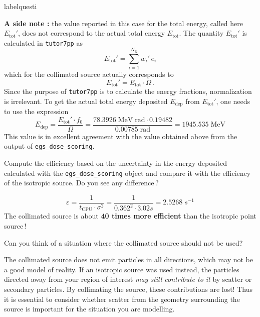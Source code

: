 \documentclass[12pt,twoside]{article}
\makeatletter
\renewcommand\thequesti         {\@arabic\c@questi}
\newenvironment{question}{
    \bfseries
    \edef\@questictr{questi}
    \expandafter
    \list \csname label\@questictr\endcsname {
        \usecounter\@questictr\def\makelabel##1{\hss\llap{##1}}
        \savebox{\questbox}             {\thequesti}
        \setlength\labelsep             {0.6em}
        \setlength\labelwidth           {\wd\questbox}
        \setlength\leftmargini          {\labelwidth}
        \addtolength{\leftmargini}      {\labelsep}
        \addtolength{\leftmargini}      {0.2em}
        \leftmargin\leftmargini
        \setlength\topsep               {1em}
        \setlength\itemsep              {1.2em}
        \setlength\parsep               {0.5em}
    }
}{\normalfont\endlist}
\newenvironment{answer}{\normalfont}{\relax}
\makeatother
\begin{document}
\begin{question}
\begin{answer}
\textbf{A side note :} the value reported in this case for the total
energy, called here $E_\mathrm{tot}'$, does not correspond to the actual total
energy $E_\mathrm{tot}$. The quantity $E_\mathrm{tot}'$ is calculated in
\Verb+tutor7pp+ as
\begin{equation*}
E_\mathrm{tot}' = \sum\limits_{i=1}^{N_{\Omega}}{w_i'\, e_i}
\end{equation*}
which for the collimated source actually corresponds to
\begin{equation*}
E_\mathrm{tot}' = E_\mathrm{tot}\cdot \Omega \,.
\end{equation*}
Since the purpose of \Verb+tutor7pp+ is to calculate the energy fractions,
normalization is irrelevant. To get the actual total energy
deposited $E_\mathrm{dep}$ from $E_\mathrm{tot}'$, one needs to use the
expression
\begin{equation*}
 E_\mathrm{dep} = \frac{E_\mathrm{tot}' \cdot f_0}{\Omega}
 = \frac{78.3926\;\mathrm{MeV\;rad} \cdot 0.19482}{0.00785\;\mathrm{rad}} =
1945.535\; \mathrm{MeV}
\end{equation*}
This value is in excellent agreement with the value obtained above from the output of
\Verb+egs_dose_scoring+.
\end{answer}

\item Compute the efficiency based on the uncertainty in the energy deposited
calculated with the \Verb+egs_dose_scoring+ object and compare it with the
efficiency of the isotropic source. Do you see any difference\,?

\begin{answer}
\begin{equation*}
\varepsilon = \frac{1}{t_\mathrm{CPU}\cdot \sigma^2} = \frac{1}{0.362^2 \cdot
3.02 s} = 2.5268\; s^{-1}
\end{equation*}
The collimated source is about \textbf{40 times more efficient} than the
isotropic point source\,!
\end{answer}

\item Can you think of a situation where the collimated source should not be used?

\begin{answer}
The collimated source does not emit particles in all directions, which may not be a good model of reality. If an isotropic source was used instead, the particles directed away from your region of interest \textit{may still contribute to it} by scatter or secondary particles. By collimating the source, these contributions are lost! Thus it is essential to consider whether scatter from the geometry surrounding the source is important for the situation you are modelling.
\end{answer}

\end{question}
\end{document}
